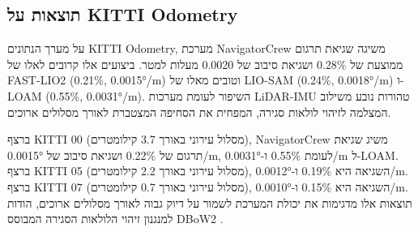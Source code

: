 \begin{table}[htbp]
\centering
\caption{תוצאות ATE RMSE [cm] על מערך הנתונים EuRoC MAV. הערכים הממוצעים על פני 11 רצפים, עם סטיית תקן בסוגריים.}
\label{tab:ch08_euroc_results}
\end{table}

\subsection{תוצאות על KITTI Odometry}
\label{sec:ch08_kitti}

על מערך הנתונים KITTI Odometry, מערכת NavigatorCrew משיגה שגיאת תרגום ממוצעת של 0.28\% ושגיאת סיבוב של 0.0020 מעלות למטר. ביצועים אלו קרובים לאלו של FAST-LIO2 \cite{Xu2022FASTLIO2} (0.21\%, 0.0015°/m) וטובים מאלו של LIO-SAM \cite{Shan2020LIOSAM} (0.24\%, 0.0018°/m) ו-LOAM \cite{Zhang2014LOAM} (0.55\%, 0.0031°/m). השיפור לעומת מערכות LiDAR-IMU טהורות נובע משילוב המצלמה לזיהוי לולאות סגירה, המפחית את הסחיפה המצטברת לאורך מסלולים ארוכים.

ברצף KITTI 00 (מסלול עירוני באורך 3.7 קילומטרים), NavigatorCrew משיג שגיאת תרגום של 0.22\% ושגיאת סיבוב של 0.0015°/m, לעומת 0.55\% ו-0.0031°/m ל-LOAM. ברצף KITTI 05 (מסלול עירוני באורך 2.2 קילומטרים), השגיאה היא 0.19\% ו-0.0012°/m. ברצף KITTI 07 (מסלול עירוני באורך 0.7 קילומטרים), השגיאה היא 0.15\% ו-0.0010°/m. תוצאות אלו מדגימות את יכולת המערכת לשמור על דיוק גבוה לאורך מסלולים ארוכים, הודות למנגנון זיהוי הלולאות הסגירה המבוסס DBoW2 \cite{GalvezLopez2012DBoW2}.

